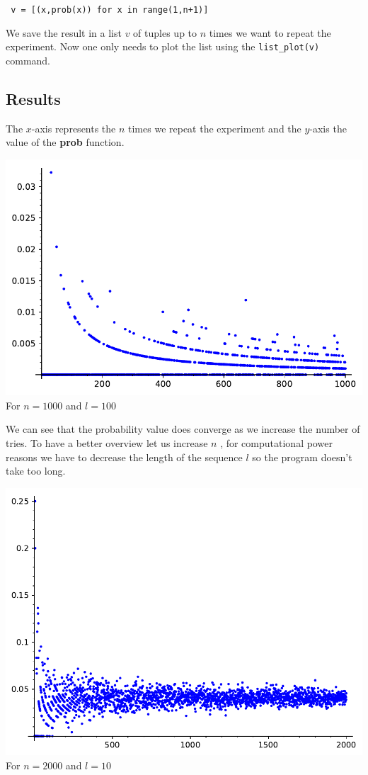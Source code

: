 \documentclass[a4paper,13pt,oneside]{article}
\theoremstyle{remark}
\begin{document}
\texttt{	v = [(x,prob(x))  for x in range(1,n+1)]} \\
\begin{flushleft}

We save the result in a list $v$ of tuples up to $n$ times we want to repeat the experiment.
Now one only needs to plot the list using the \texttt{list_plot(v)} command.
\end{flushleft}
\pagebreak
\subsection{Results}
The $x$-axis represents the $n$ times we repeat the experiment and the $y$-axis the value of the \textbf{prob} function. 
\begin{center}

	\includegraphics[width=.7\linewidth]{p1.pdf}\\
	For $n=1000$ and $l=100$
\end{center}
\begin{flushleft}
We can see that the probability value does converge as we increase the number of tries.
To have a better overview let us increase $n$ , for computational power reasons we have to decrease the length of the sequence $l$ so the program doesn't take too long. 
\end{flushleft}
\begin{center}
		\includegraphics[width=.7\linewidth]{p2.pdf}\\
	For $n=2000$ and $l=10$
\end{center} 
\end{document}
